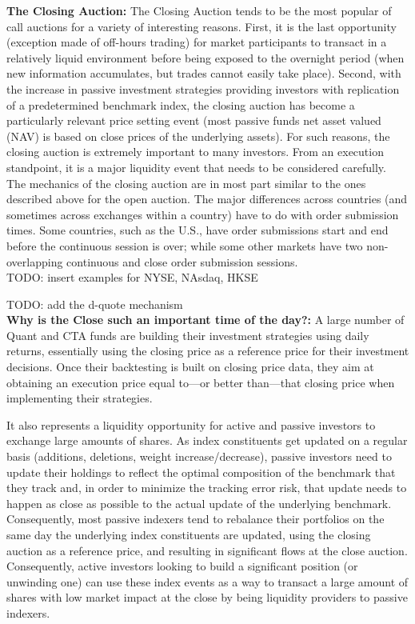 \noindent\textbf{The Closing Auction:} The Closing Auction tends to be the most popular of call auctions for a variety of interesting reasons. First, it is the last opportunity (exception made of off-hours trading) for market participants to transact in a relatively liquid environment before being exposed to the overnight period (when new information accumulates, but trades cannot easily take place). Second, with the increase in passive investment strategies providing investors with replication of a predetermined benchmark index, the closing auction has become a particularly relevant price setting event (most passive funds net asset valued (NAV) is based on close prices of the underlying assets). For such reasons, the closing auction is extremely important to many investors. From an execution standpoint, it is a major liquidity event that needs to be considered carefully. \\

The mechanics of the closing auction are in most part similar to the ones described above for the open auction. The major differences across countries (and sometimes across exchanges within a country) have to do with order submission times. Some countries, such as the U.S., have order submissions start and end before the continuous session is over; while some other markets have two non-overlapping continuous and close order submission sessions. \\

TODO: insert examples for NYSE, NAsdaq, HKSE

TODO: add the d-quote mechanism\\

\textbf{Why is the Close such an important time of the day?:}
A large number of Quant and CTA funds are building their investment strategies using daily returns, essentially using the closing price as a reference price for their investment decisions. Once their backtesting is built on closing price data, they aim at obtaining an execution price equal to---or better than---that closing price when implementing their strategies. 


It also represents a liquidity opportunity for active and passive investors to exchange large amounts of shares. As index constituents get updated on a regular basis (additions, deletions, weight increase/decrease), passive investors need to update their holdings to reflect the optimal composition of the benchmark that they track and, in order to minimize the tracking error risk, that update needs to happen as close as possible to the actual update of the underlying benchmark. Consequently, most passive indexers tend to rebalance their portfolios on the same day the underlying index constituents are updated, using the closing auction as a reference price, and resulting in significant flows at the close auction. Consequently, active investors looking to build a significant position (or unwinding one) can use these index events as a way to transact a large amount of shares with low market impact at the close by being liquidity providers to passive indexers.  



